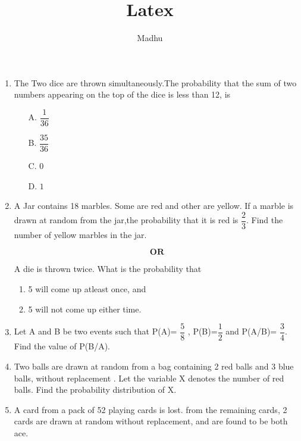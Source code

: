 \documentclass[a4paper,12pt]{article}
\begin{document}
\title{Latex}
\author{Madhu}
\maketitle
{}

\begin{enumerate}

\item The Two dice are thrown simultaneously.The probability that the sum of two numbers appearing on the top of the dice is less than 12, is

\begin{enumerate}
\item [A.]\(\dfrac{1}{36}\) \\
\item [B.]\(\dfrac{35}{36}\)\\
\item [C.]$ 0 $\\
\item [D.]$ 1 $\\
\end{enumerate}


\item A Jar contains 18 marbles. Some are red and other are yellow. If a marble is drawn at random from the jar,the probability that it is red is \(\dfrac{2}{3}\). Find the number of yellow marbles in the jar.

$$ \textbf{OR} $$

A die is thrown twice. What is the probability that 
\begin{enumerate}
\item 5 will come up atleast once, and
\item 5 will not come up either time.
\end{enumerate}

\item Let A and B be two events such that P(A)= \(\dfrac{5}{8}\) , P(B)=\(\dfrac{1}{2}\) and P(A/B)= \(\dfrac{3}{4}\). Find the value of P(B/A).

\item Two balls are drawn at random from a bag containing 2 red balls and 3 blue balls, without replacement . Let the variable X denotes the number of red balls. Find the probability distribution of X.

\item A card from a pack of 52 playing cards is lost. from the remaining cards, 2 cards are drawn at random without replacement, and are found to be both ace.


\end{enumerate}
\end{document}
